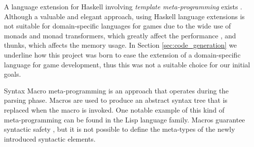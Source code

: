 A language extension for Haskell involving \textit{template meta-programming} exists \cite{sheard2002template}. Although a valuable and elegant approach, using Haskell language extensions is not suitable for domain-specific languages for games due to the wide use of monads and monad transformers, which greatly affect the performance \cite{oleg2016}, and thunks, which affects the memory usage. In Section \ref{sec:code_generation} we underline how this project was born to ease the extension of a domain-specific language for game development, thus this was not a suitable choice for our initial goals.

Syntax Macro meta-programming \cite{campbell1978compiler} is an approach that operates during the parsing phase. Macros are used to produce an abstract syntax tree that is replaced when the macro is invoked. One notable example of this kind of \\meta-programming can be found in the Lisp language family. Macros guarantee syntactic safety \cite{weise1993programmable}, but it is not possible to define the meta-types of the newly introduced syntactic elements.